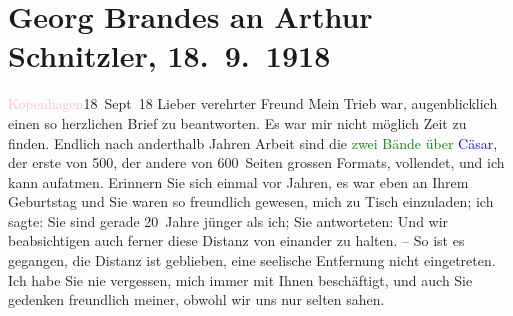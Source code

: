 

               \section[Georg Brandes an Arthur Schnitzler, 18. 9. 1918]{ Georg Brandes an Arthur Schnitzler, 18. 9. 1918}\nopagebreak{}\rehead{ }\normalsize\beginnumbering{} \toendnotes[C]{\smallbreak\pagebreak[2]} 
\toendnotes[C]{\smallbreak}\pstart
           \raggedleft{}{\pb}\textcolor{pink}{Kopenhagen}{}\ledrightnote{\textcolor{pink}{Kopenhagen}}{ }18 Sept 18\pend
           \pstart{}Lieber verehrter Freund\pend\pstart
           Mein Trieb war, augenblicklich einen so herzlichen Brief zu beantworten. Es war
                    mir nicht möglich Zeit zu finden. Endlich nach anderthalb Jahren Arbeit sind die
                        \textcolor{green}{zwei Bände über \textcolor{blue}{Cäsar}{}\ledrightnote{\textcolor{blue}{Gaius Iulius Caesar}}}{}, der erste von 500, der andere von 600 Seiten grossen Formats, vollendet,
                    und ich kann aufatmen.\pend
           \pstart
           Erinnern Sie sich einmal vor Jahren, es war eben an Ihrem Geburtstag und Sie
                    waren so freundlich gewesen, mich zu Tisch einzuladen; ich sagte: Sie sind
                    gerade 20 Jahre jünger als ich; Sie antworteten: Und wir beabsichtigen auch
                    ferner diese Distanz von einander zu halten. – So ist es gegangen, die Distanz
                    ist geblieben, eine seelische Entfernung nicht eingetreten.\pend
           \pstart
           Ich habe Sie nie vergessen, mich immer mit Ihnen beschäftigt, und auch Sie
                    gedenken freundlich meiner, obwohl wir uns nur selten sahen.\pend
           \pstart
